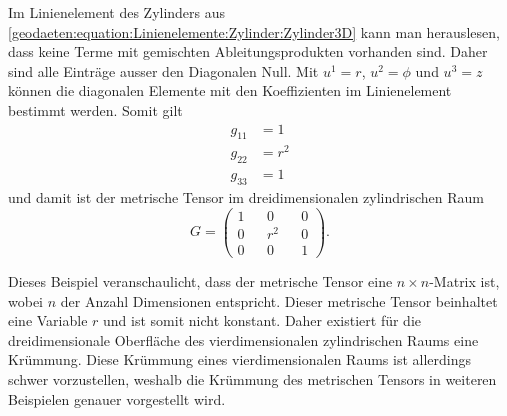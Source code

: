 Im Linienelement des Zylinders aus \eqref{geodaeten:equation:Linienelemente:Zylinder:Zylinder3D} kann man herauslesen, dass keine Terme mit gemischten Ableitungsprodukten vorhanden sind.
Daher sind alle Einträge ausser den Diagonalen Null.
Mit $u^1 = r$, $u^2 = \phi$ und $u^3 = z$  können die diagonalen Elemente mit den Koeffizienten im Linienelement bestimmt werden. 
Somit gilt
\begin{equation}
	\begin{aligned}
		g_{11}  &= 1  \\
		g_{22}  &= r^2 \\
		g_{33}  &= 1  
	\end{aligned}
\end{equation}
und damit ist der metrische Tensor im dreidimensionalen zylindrischen Raum
\begin{equation}
	G = \begin{pmatrix} 1 && 0 && 0 \\ 0 && r^2 && 0 \\ 0 && 0 && 1 \end{pmatrix} .
\end{equation}

Dieses Beispiel veranschaulicht, dass der metrische Tensor eine $n \times n$-Matrix ist, wobei $n$ der Anzahl Dimensionen entspricht.
Dieser metrische Tensor beinhaltet eine Variable $r$ und ist somit nicht konstant. 
Daher existiert für die dreidimensionale Oberfläche des vierdimensionalen zylindrischen Raums eine Krümmung.
Diese Krümmung eines vierdimensionalen Raums ist allerdings schwer vorzustellen, weshalb die Krümmung des metrischen Tensors in weiteren Beispielen genauer vorgestellt wird.

